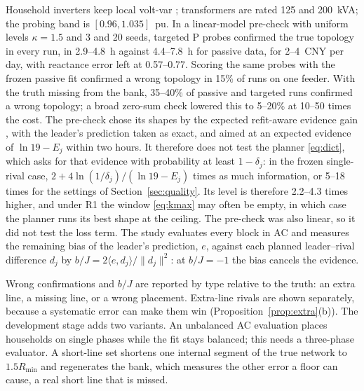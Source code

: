\documentclass[journal,onecolumn,11pt]{IEEEtran}
\begin{document}
Household inverters keep local volt-var \cite{asnzs4777,cec2021}; transformers are rated 125 and 200~kVA; the probing band is $[0.96,1.035]$~pu. In a linear-model pre-check with uniform levels $\kappa=1.5$ and 3 and 20 seeds, targeted P probes confirmed the true topology in every run, in 2.9--4.8~h against 4.4--7.8~h for passive data, for 2--4~CNY per day, with reactance error left at 0.57--0.77. Scoring the same probes with the frozen passive fit confirmed a wrong topology in 15\% of runs on one feeder. With the truth missing from the bank, 35--40\% of passive and targeted runs confirmed a wrong topology; a broad zero-sum check lowered this to 5--20\% at 10--50 times the cost. The pre-check chose its shapes by the expected refit-aware evidence gain \cite{atkinson1975}, with the leader's prediction taken as exact, and aimed at an expected evidence of $\ln19-E_j$ within two hours. It therefore does not test the planner \eqref{eq:dict}, which asks for that evidence with probability at least $1-\delta_j$: in the frozen single-rival case, $2+4\ln(1/\delta_j)/(\ln19-E_j)$ times as much information, or 5--18 times for the settings of Section~\ref{sec:quality}. Its level is therefore 2.2--4.3 times higher, and under R1 the window \eqref{eq:kmax} may often be empty, in which case the planner runs its best shape at the ceiling. The pre-check was also linear, so it did not test the loss term. The study evaluates every block in AC and measures the remaining bias of the leader's prediction, $e$, against each planned leader--rival difference $d_j$ by $b/J=2\langle e,d_j\rangle/\|d_j\|^2$: at $b/J=-1$ the bias cancels the evidence.

Wrong confirmations and $b/J$ are reported by type relative to the truth: an extra line, a missing line, or a wrong placement. Extra-line rivals are shown separately, because a systematic error can make them win (Proposition~\ref{prop:extra}(b)). The development stage adds two variants. An unbalanced AC evaluation places households on single phases while the fit stays balanced; this needs a three-phase evaluator. A short-line set shortens one internal segment of the true network to $1.5R_{\min}$ and regenerates the bank, which measures the other error a floor can cause, a real short line that is missed.

\appendices
\end{document}
